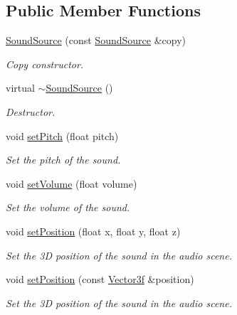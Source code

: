 \subsection*{Public Member Functions}
\begin{DoxyCompactItemize}
\item 
\hyperlink{classsf_1_1_sound_source_ae0c7728c1449fdebe65749ab6fcb3170}{Sound\+Source} (const \hyperlink{classsf_1_1_sound_source}{Sound\+Source} \&copy)
\begin{DoxyCompactList}\small\item\em Copy constructor. \end{DoxyCompactList}\item 
\mbox{\label{classsf_1_1_sound_source_a77c7c1524f8cb81df2de9375b0f87c5c}} 
virtual \hyperlink{classsf_1_1_sound_source_a77c7c1524f8cb81df2de9375b0f87c5c}{$\sim$\+Sound\+Source} ()
\begin{DoxyCompactList}\small\item\em Destructor. \end{DoxyCompactList}\item 
void \hyperlink{classsf_1_1_sound_source_a72a13695ed48b7f7b55e7cd4431f4bb6}{set\+Pitch} (float pitch)
\begin{DoxyCompactList}\small\item\em Set the pitch of the sound. \end{DoxyCompactList}\item 
void \hyperlink{classsf_1_1_sound_source_a2f192f2b49fb8e2b82f3498d3663fcc2}{set\+Volume} (float volume)
\begin{DoxyCompactList}\small\item\em Set the volume of the sound. \end{DoxyCompactList}\item 
void \hyperlink{classsf_1_1_sound_source_a0480257ea25d986eba6cc3c1a6f8d7c2}{set\+Position} (float x, float y, float z)
\begin{DoxyCompactList}\small\item\em Set the 3D position of the sound in the audio scene. \end{DoxyCompactList}\item 
void \hyperlink{classsf_1_1_sound_source_a17ba9ed01925395652181a7b2a7d3aef}{set\+Position} (const \hyperlink{classsf_1_1_vector3}{Vector3f} \&position)
\begin{DoxyCompactList}\small\item\em Set the 3D position of the sound in the audio scene. \end{DoxyCompactList}\item 

\end{DoxyCompactItemize}
